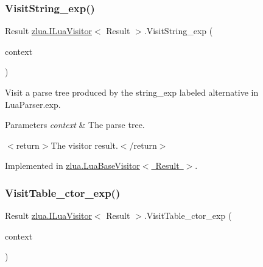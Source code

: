 \subsubsection{\texorpdfstring{Visit\+String\+\_\+exp()}{VisitString\_exp()}}
{\footnotesize\ttfamily Result \mbox{\hyperlink{interfacezlua_1_1_i_lua_visitor}{zlua.\+I\+Lua\+Visitor}}$<$ Result $>$.Visit\+String\+\_\+exp (\begin{DoxyParamCaption}\item[{\mbox{[}\+Not\+Null\mbox{]} \mbox{\hyperlink{classzlua_1_1_lua_parser_1_1_string__exp_context}{Lua\+Parser.\+String\+\_\+exp\+Context}}}]{context }\end{DoxyParamCaption})}



Visit a parse tree produced by the {\ttfamily string\+\_\+exp} labeled alternative in Lua\+Parser.\+exp. 


\begin{DoxyParams}{Parameters}
{\em context} & The parse tree.\\
\hline
\end{DoxyParams}
$<$return$>$The visitor result.$<$/return$>$ 

Implemented in \mbox{\hyperlink{classzlua_1_1_lua_base_visitor_a7a571a797280a12b079c84c9c2438f5f}{zlua.\+Lua\+Base\+Visitor$<$ Result $>$}}.

\mbox{\label{interfacezlua_1_1_i_lua_visitor_a0a1b5d873890318ed0259f93eac4a5b7}} 
\subsubsection{\texorpdfstring{Visit\+Table\+\_\+ctor\+\_\+exp()}{VisitTable\_ctor\_exp()}}
{\footnotesize\ttfamily Result \mbox{\hyperlink{interfacezlua_1_1_i_lua_visitor}{zlua.\+I\+Lua\+Visitor}}$<$ Result $>$.Visit\+Table\+\_\+ctor\+\_\+exp (\begin{DoxyParamCaption}\item[{\mbox{[}\+Not\+Null\mbox{]} \mbox{\hyperlink{classzlua_1_1_lua_parser_1_1_table__ctor__exp_context}{Lua\+Parser.\+Table\+\_\+ctor\+\_\+exp\+Context}}}]{context }\end{DoxyParamCaption})}




